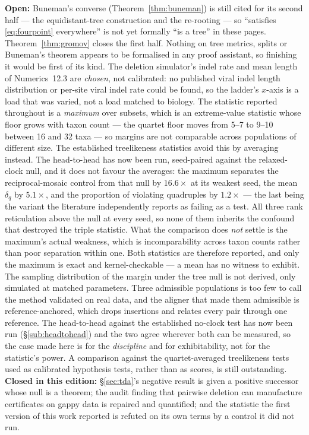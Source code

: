 \begin{ledger}
\textbf{Open:} Buneman's converse (Theorem~\ref{thm:buneman}) is still cited for
its second half --- the equidistant-tree construction and the re-rooting --- so
``satisfies \eqref{eq:fourpoint} everywhere'' is not yet formally ``is a tree''
in these pages. Theorem~\ref{thm:gromov} closes the first half. Nothing on tree
metrics, splits or Buneman's theorem appears to be formalised in any proof
assistant, so finishing it would be first of its kind.
The deletion simulator's indel rate and mean length of Numerics~12.3 are
\emph{chosen}, not calibrated: no published viral indel length distribution or
per-site viral indel rate could be found, so the ladder's $x$-axis is a
load that was varied, not a load matched to biology.
The statistic reported throughout is a \emph{maximum} over subsets, which is an
extreme-value statistic whose floor grows with taxon count --- the quartet floor
moves from 5--7 to 9--10 between 16 and 32 taxa --- so margins are not comparable
across populations of different size. The established treelikeness statistics
avoid this by averaging instead. The head-to-head has now been run, seed-paired
against the relaxed-clock null, and it does not favour the averages: the maximum
separates the reciprocal-mosaic control from that null by $16.6\times$ at its
weakest seed, the mean $\delta_q$ by $5.1\times$, and the proportion of violating
quadruples by $1.2\times$ --- the last being the variant the literature
independently reports as failing as a test. All three rank reticulation above the
null at every seed, so none of them inherits the confound that destroyed the
triple statistic. What the comparison does \emph{not} settle is the maximum's
actual weakness, which is incomparability across taxon counts rather than poor
separation within one. Both statistics are therefore reported, and only the
maximum is exact and kernel-checkable --- a mean has no witness to exhibit. The sampling distribution of the margin under the tree null is not
derived, only simulated at matched parameters. Three admissible populations is
too few to call the method validated on real data, and the aligner that made
them admissible is reference-anchored, which drops insertions and relates every
pair through one reference. The head-to-head against the established no-clock
test has now been run (\S\ref{sub:headtohead}) and the two agree wherever both
can be measured, so the case made here is for the \emph{discipline} and for
exhibitability, not for the statistic's power. A comparison against the
quartet-averaged treelikeness tests used as calibrated hypothesis tests, rather
than as scores, is still outstanding. \\
\textbf{Closed in this edition:} \S\ref{sec:tda}'s negative result is given a
positive successor whose null is a theorem; the audit finding that pairwise
deletion can manufacture certificates on gappy data is repaired and quantified;
and the statistic the first version of this work reported is refuted on its own
terms by a control it did not run.
\end{ledger}
